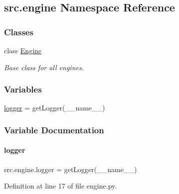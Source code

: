 \hypertarget{namespacesrc_1_1engine}{}\subsection{src.\+engine Namespace Reference}
\label{namespacesrc_1_1engine}
\subsubsection*{Classes}
\begin{DoxyCompactItemize}
\item 
class \hyperlink{classsrc_1_1engine_1_1Engine}{Engine}
\begin{DoxyCompactList}\small\item\em Base class for all engines. \end{DoxyCompactList}\end{DoxyCompactItemize}
\subsubsection*{Variables}
\begin{DoxyCompactItemize}
\item 
\hyperlink{namespacesrc_1_1engine_a858e07e55b5a9e3b6165243499d2b2b6}{logger} = get\+Logger(\+\_\+\+\_\+name\+\_\+\+\_\+)
\end{DoxyCompactItemize}


\subsubsection{Variable Documentation}
\mbox{\label{namespacesrc_1_1engine_a858e07e55b5a9e3b6165243499d2b2b6}} 
\paragraph{\texorpdfstring{logger}{logger}}
{\footnotesize\ttfamily src.\+engine.\+logger = get\+Logger(\+\_\+\+\_\+name\+\_\+\+\_\+)}



Definition at line 17 of file engine.\+py.

